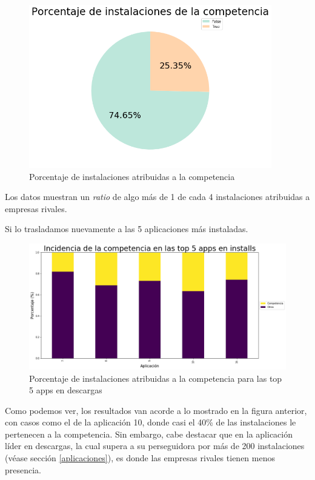 \documentclass[a4paper, 12pt]{article}
\begin{document}
		\begin{figure}[h]
			\centering
			\includegraphics[width=300pt]{images/installs/implicit.png}
			\caption{Porcentaje de instalaciones atribuidas a la competencia}
		\end{figure}
		
		Los datos muestran un \textit{ratio} de algo más de 1 de cada 4 instalaciones atribuidas a empresas rivales.
		
		Si lo trasladamos nuevamente a las 5 aplicaciones más instaladas.
		
		\begin{figure}[h]
			\centering
			\includegraphics[width=\textwidth]{images/installs/incidenciacomp.png}
			\caption{Porcentaje de instalaciones atribuidas a la competencia para las top 5 apps en descargas}
		\end{figure}
		
		Como podemos ver, los resultados van acorde a lo mostrado en la figura anterior, con casos como el de la aplicación 10, donde casi el 40\% de las instalaciones le pertenecen a la competencia. Sin embargo, cabe destacar que en la aplicación líder en descargas, la cual supera a su perseguidora por más de 200 instalaciones (véase sección \ref{aplicaciones}), es donde las empresas rivales tienen menos presencia.
		
\end{document}
